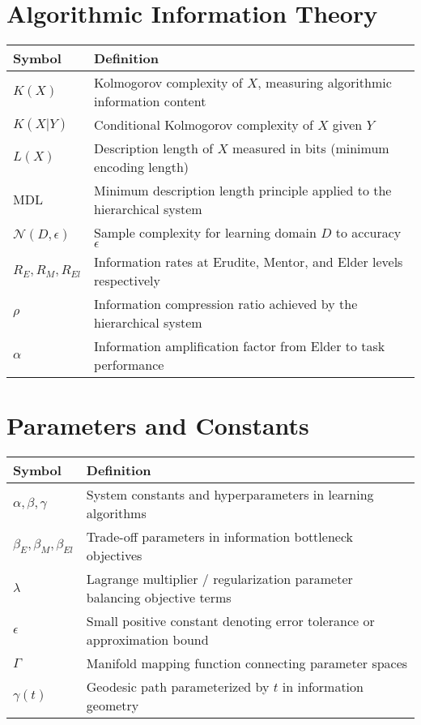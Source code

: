 \section*{Algorithmic Information Theory}
\begin{center}
\begin{tabular}{>{\centering\arraybackslash}p{3cm} p{10cm}}
\hline
\textbf{Symbol} & \textbf{Definition} \\
\hline
$K(X)$ & Kolmogorov complexity of $X$, measuring algorithmic information content \\
$K(X|Y)$ & Conditional Kolmogorov complexity of $X$ given $Y$ \\
$L(X)$ & Description length of $X$ measured in bits (minimum encoding length) \\
$\text{MDL}$ & Minimum description length principle applied to the hierarchical system \\
$\mathcal{N}(D, \epsilon)$ & Sample complexity for learning domain $D$ to accuracy $\epsilon$ \\
$R_E, R_M, R_{El}$ & Information rates at Erudite, Mentor, and Elder levels respectively \\
$\rho$ & Information compression ratio achieved by the hierarchical system \\
$\alpha$ & Information amplification factor from Elder to task performance \\
\hline
\end{tabular}
\end{center}

\vspace{0.5cm}

\section*{Parameters and Constants}
\begin{center}
\begin{tabular}{>{\centering\arraybackslash}p{3cm} p{10cm}}
\hline
\textbf{Symbol} & \textbf{Definition} \\
\hline
$\alpha, \beta, \gamma$ & System constants and hyperparameters in learning algorithms \\
$\beta_E, \beta_M, \beta_{El}$ & Trade-off parameters in information bottleneck objectives \\
$\lambda$ & Lagrange multiplier / regularization parameter balancing objective terms \\
$\epsilon$ & Small positive constant denoting error tolerance or approximation bound \\
$\Gamma$ & Manifold mapping function connecting parameter spaces \\
$\gamma(t)$ & Geodesic path parameterized by $t$ in information geometry \\
\hline
\end{tabular}
\end{center}

